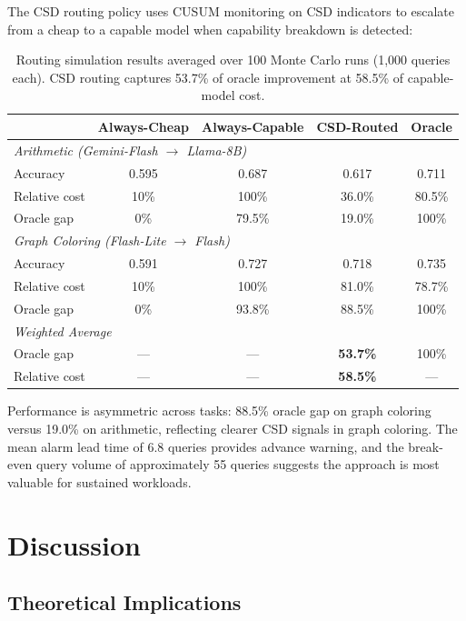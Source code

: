 \documentclass[11pt,letterpaper]{article}
\begin{document}
The CSD routing policy uses CUSUM monitoring on CSD indicators to escalate from a cheap to a capable model when capability breakdown is detected:

\begin{table}[!htbp]
\centering
\caption{Routing simulation results averaged over 100 Monte Carlo runs (1,000 queries each). CSD routing captures 53.7\% of oracle improvement at 58.5\% of capable-model cost.}
\label{tab:routing}
\begin{tabular}{lcccc}
\toprule
 & \textbf{Always-Cheap} & \textbf{Always-Capable} & \textbf{CSD-Routed} & \textbf{Oracle} \\
\midrule
\multicolumn{5}{l}{\emph{Arithmetic (Gemini-Flash $\to$ Llama-8B)}} \\
Accuracy & 0.595 & 0.687 & 0.617 & 0.711 \\
Relative cost & 10\% & 100\% & 36.0\% & 80.5\% \\
Oracle gap & 0\% & 79.5\% & 19.0\% & 100\% \\
\midrule
\multicolumn{5}{l}{\emph{Graph Coloring (Flash-Lite $\to$ Flash)}} \\
Accuracy & 0.591 & 0.727 & 0.718 & 0.735 \\
Relative cost & 10\% & 100\% & 81.0\% & 78.7\% \\
Oracle gap & 0\% & 93.8\% & 88.5\% & 100\% \\
\midrule
\multicolumn{5}{l}{\emph{Weighted Average}} \\
Oracle gap & --- & --- & \textbf{53.7\%} & 100\% \\
Relative cost & --- & --- & \textbf{58.5\%} & --- \\
\bottomrule
\end{tabular}
\end{table}

Performance is asymmetric across tasks: 88.5\% oracle gap on graph coloring versus 19.0\% on arithmetic, reflecting clearer CSD signals in graph coloring. The mean alarm lead time of 6.8 queries provides advance warning, and the break-even query volume of approximately 55 queries suggests the approach is most valuable for sustained workloads.


\section{Discussion}

\subsection{Theoretical Implications}
\end{document}

